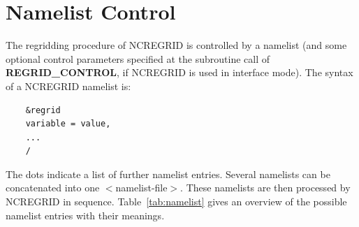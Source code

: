 \documentclass[12pt, a4paper]{article}
\begin{document}
\section{Namelist Control}
\label{sec:namelist}
The regridding procedure of NCREGRID is controlled by a
namelist (and some optional control parameters
specified at the subroutine call of {\bf REGRID\_CONTROL}, if NCREGRID is
used in interface mode).
The syntax of a NCREGRID namelist is:
\begin{verbatim}
    &regrid
    variable = value,
    ...
    /
\end{verbatim}
The dots indicate a list of further namelist entries.
Several namelists can be concatenated into one $<$namelist-file$>$.
These namelists are
then processed by NCREGRID in sequence.
Table~\ref{tab:namelist} gives an overview of the possible namelist entries
with their meanings.
%
\end{document}
